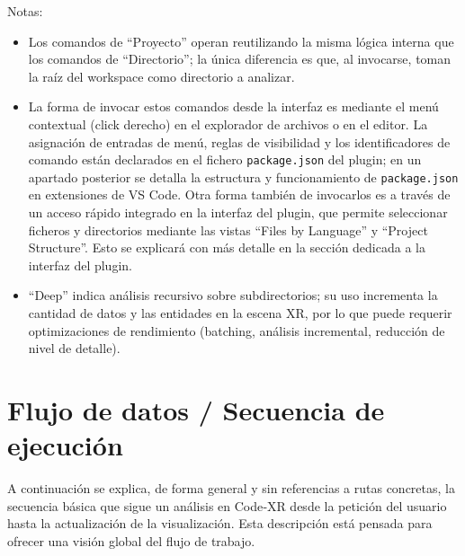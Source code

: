 \documentclass[a4paper, 12pt]{book}
\begin{document}
Notas:
\begin{itemize}
  \item Los comandos de ``Proyecto'' operan reutilizando la misma lógica interna que los comandos de ``Directorio''; la única diferencia es que, al invocarse, toman la raíz del workspace como directorio a analizar.
  \item La forma de invocar estos comandos desde la interfaz es mediante el menú contextual (click derecho) en el explorador de archivos o en el editor. La asignación de entradas de menú, reglas de visibilidad y los identificadores de comando están declarados en el fichero \texttt{package.json} del plugin; en un apartado posterior se detalla la estructura y funcionamiento de \texttt{package.json} en extensiones de VS Code. Otra forma también de invocarlos es a través de un acceso rápido integrado en la interfaz del plugin, que permite seleccionar ficheros y directorios mediante las vistas ``Files by Language'' y ``Project Structure''. Esto se explicará con más detalle en la sección dedicada a la interfaz del plugin.
  \item ``Deep'' indica análisis recursivo sobre subdirectorios; su uso incrementa la cantidad de datos y las entidades en la escena XR, por lo que puede requerir optimizaciones de rendimiento (batching, análisis incremental, reducción de nivel de detalle).
\end{itemize}


\section{Flujo de datos / Secuencia de ejecución}
\label{sec:flujo-ejecucion}


A continuación se explica, de forma general y sin referencias a rutas concretas, la secuencia básica que sigue un análisis en Code‑XR desde la petición del usuario hasta la actualización de la visualización. Esta descripción está pensada para ofrecer una visión global del flujo de trabajo.
\end{document}
